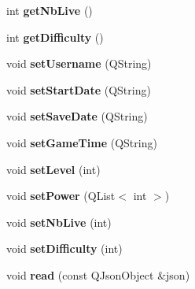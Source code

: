 \begin{DoxyCompactItemize}
\item 
\hypertarget{class_profil_a4747a4a9cf7d22203bc316f3a0753033}{}int {\bfseries get\+Nb\+Live} ()\label{class_profil_a4747a4a9cf7d22203bc316f3a0753033}

\item 
\hypertarget{class_profil_a10c2f4863000e5525f8504a22ccf1260}{}int {\bfseries get\+Difficulty} ()\label{class_profil_a10c2f4863000e5525f8504a22ccf1260}

\item 
\hypertarget{class_profil_a23d36025cd3b9ad9ff128021b16c2431}{}void {\bfseries set\+Username} (Q\+String)\label{class_profil_a23d36025cd3b9ad9ff128021b16c2431}

\item 
\hypertarget{class_profil_a3d6b5ead3c4e6af1aa3f4035fb3dd624}{}void {\bfseries set\+Start\+Date} (Q\+String)\label{class_profil_a3d6b5ead3c4e6af1aa3f4035fb3dd624}

\item 
\hypertarget{class_profil_a484838bb61b18b3c82fede9aaad41b35}{}void {\bfseries set\+Save\+Date} (Q\+String)\label{class_profil_a484838bb61b18b3c82fede9aaad41b35}

\item 
\hypertarget{class_profil_a2c9a526c1a26cb8b91c20a3a6df0ccc6}{}void {\bfseries set\+Game\+Time} (Q\+String)\label{class_profil_a2c9a526c1a26cb8b91c20a3a6df0ccc6}

\item 
\hypertarget{class_profil_a7edbce434f4b1c1bf1d98b704fcc650e}{}void {\bfseries set\+Level} (int)\label{class_profil_a7edbce434f4b1c1bf1d98b704fcc650e}

\item 
\hypertarget{class_profil_a1322566ebccffe1636df61c9bc74695d}{}void {\bfseries set\+Power} (Q\+List$<$ int $>$)\label{class_profil_a1322566ebccffe1636df61c9bc74695d}

\item 
\hypertarget{class_profil_ae8d5b07cd8bd4d8ad2a1e1b431056a0f}{}void {\bfseries set\+Nb\+Live} (int)\label{class_profil_ae8d5b07cd8bd4d8ad2a1e1b431056a0f}

\item 
\hypertarget{class_profil_ab4c02fb71667985e9e9ffe991ea6b824}{}void {\bfseries set\+Difficulty} (int)\label{class_profil_ab4c02fb71667985e9e9ffe991ea6b824}

\item 
\hypertarget{class_profil_ab834326ebb9864fca5aec8020d0ad6f8}{}void {\bfseries read} (const Q\+Json\+Object \&json)\label{class_profil_ab834326ebb9864fca5aec8020d0ad6f8}


\end{DoxyCompactItemize}
